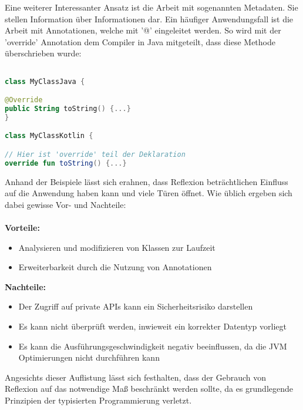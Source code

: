 \bigskip
Eine weiterer Interessanter Ansatz ist die Arbeit mit sogenannten Metadaten. Sie stellen Information über Informationen dar. Ein häufiger Anwendungsfall ist die Arbeit mit Annotationen, welche mit '@' eingeleitet werden. So wird mit der 'override' Annotation dem Compiler in Java mitgeteilt, dass diese Methode überschrieben wurde:
\begin{lstlisting}[caption={Override Annotation}, label={lst:data-class}, language=Kotlin]

class MyClassJava {

@Override
public String toString() {...}
}

class MyClassKotlin {

// Hier ist 'override' teil der Deklaration
override fun toString() {...}
\end{lstlisting}
\bigskip
Anhand der Beispiele lässt sich erahnen, dass Reflexion beträchtlichen Einfluss auf die Anwendung haben kann und viele Türen öffnet. Wie üblich ergeben sich dabei gewisse Vor- und Nachteile:
\\
\\
\textbf{Vorteile:}
\begin{itemize}
	\item Analysieren und modifizieren von Klassen zur Laufzeit
	\item Erweiterbarkeit durch die Nutzung von Annotationen 
\end{itemize}
\textbf{Nachteile:}
\begin{itemize}
	\item Der Zugriff auf private APIs kann ein Sicherheitsrisiko darstellen
	\item Es kann nicht überprüft werden, inwieweit ein korrekter Datentyp vorliegt
	\item Es kann die Ausführungsgeschwindigkeit negativ beeinflussen, da die JVM Optimierungen nicht durchführen kann 
\end{itemize}
Angesichts dieser Auflistung lässt sich festhalten, dass der Gebrauch von Reflexion auf das notwendige Maß beschränkt werden sollte, da es grundlegende Prinzipien der typisierten Programmierung verletzt.

